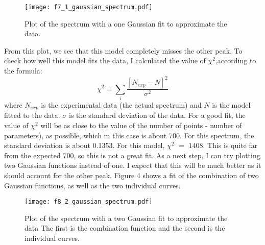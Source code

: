 \documentclass[12pt]{report}
\begin{document}
\begin{figure}[!htb]
\centering
\texttt{[image: f7\_1\_gaussian\_spectrum.pdf]}
\caption{Plot of the spectrum with a one Gaussian fit to approximate the data.}
\label{fig:f3}
\end{figure}

From this plot, we see that this model completely misses the other peak.
To check how well this model fits the data, I calculated the value of $\chi^{2}$,according to the formula:
\begin{equation}
\chi^{2} = \sum\limits_{i} \frac{[N_{exp} - N]^{2}}{\sigma^{2}}
\end{equation}
where $N_{exp}$ is the experimental data (the actual spectrum) and $N$ is the model fitted to the data. 
$\sigma$ is the standard deviation of the data. For a good fit, the value of $\chi^{2}$ will be as close to the value of the number of points - number of parameters), as possible, which in this case is about 700.
For this spectrum, the standard deviation is about 0.1353. 
For this model, $\chi^{2}$ $=$ $1408$. This is quite far from the expected 700, so this is not a great fit. 
As a next step, I can try plotting two Gaussian functions instead of one.
I expect that this will be much better as it should account for the other peak. Figure 4 shows a fit of the combination of two Gaussian functions, as well as the two individual curves.

\begin{figure}[!htb]
\centering
\texttt{[image: f8\_2\_gaussian\_spectrum.pdf]}
\caption{Plot of the spectrum with a two Gaussian fit to approximate the data The first is the combination function and the second is the individual curves.}
\label{fig:f4}
\end{figure}
\end{document}
